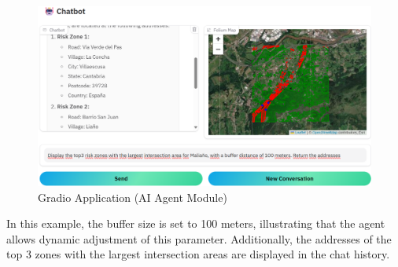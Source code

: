 \begin{figure}[H]
 \centering
 \includegraphics[scale=0.37]{IMAGENES/Gradio_app_chatbot2.png}
 \captionsetup{font=large}
 \caption {Gradio Application (AI Agent Module)}
\end{figure}

In this example, the buffer size is set to 100 meters, illustrating that the agent allows dynamic adjustment of this parameter. Additionally, the addresses of the top 3 zones with the largest intersection areas are displayed in the chat history.\\







